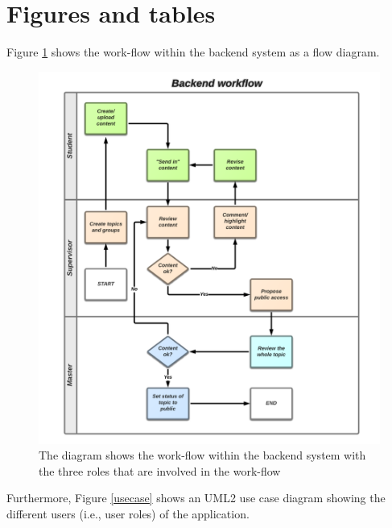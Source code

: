 \section{Figures and tables}
Figure \ref{workflow_backend} shows the work-flow within the backend system as a flow diagram.

\begin{figure}[th]
\centerline{\includegraphics[width=1.3\textwidth]{gfx/HiP-Backend-Workflow}}
\caption{The diagram shows the work-flow within the backend system with the three roles that are involved in the work-flow}
\label{workflow_backend}
\end{figure}

Furthermore, Figure \ref{usecase} shows an \ac{UML2} use case diagram showing the different users (i.e., user roles) of the application.


